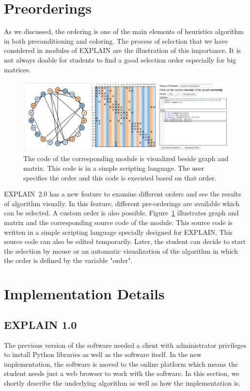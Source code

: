 \documentclass[12pt, twoside]{book}
\begin{document}
\section{Preorderings}
As we discussed, the ordering is one of the main elements of heuristics algorithm
in both preconditioning and coloring. The process of selection that we have
considered in modules of \mbox{EXPLAIN} are the illustration of this importance.
It is not always doable for students to find a good selection order especially for
big matrices.
\begin{figure}
\centering
\includegraphics[width=\textwidth]{custom_module}
\caption{The code of the corresponding module is visualized beside
graph and matrix. This code is in a simple scripting language.
The user specifies the order and this code is executed based on that order.}
\label{f.custom_module}
\end{figure}

\mbox{EXPLAIN 2.0} has a new feature to examine different orders
and see the results of algorithm visually. In this feature, different
pre-orderings are available which can be selected. A custom order is
also possible. Figure~\ref{f.custom_module} illustrates graph and matrix
and the corresponding source code of the module. This source code
is written in a simple scripting language specially designed for \mbox{EXPLAIN}.
This source code can also be edited temporarily. Later, the student can
decide to start the selection by mouse or an automatic visualization
of the algorithm in which the order is defined by the variable "order".

\section{Implementation Details}
\label{s.impl.explain}
\subsection{EXPLAIN 1.0}
\label{s.impl.explain1}
The previous version of the software \cite{Lulfesmann2010} needed a client with administrator privileges to install Python libraries as well as the software itself. In the new implementation, the software is moved to the online platform which means the student needs just a web browser to work with the software. In this section, we shortly describe the underlying algorithm as well as how the implementation is.
\end{document}
